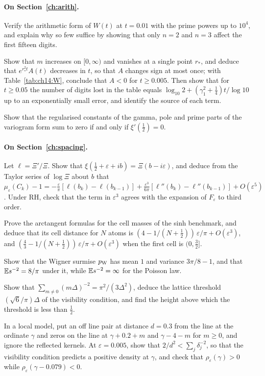 \paragraph{On Section~\ref{ch:arith}.}
\begin{exercises}
\item Verify the arithmetic form of $W(t)$ at $t=0.01$ with the prime powers up to $10^4$, and explain why so few suffice by showing that only $n=2$ and $n=3$ affect the first fifteen digits.
\item\label{ex:ch14:law} Show that $m$ increases on $[0,\infty)$ and vanishes at a single point $r_*$, and deduce that $e^{r_*^2t}A(t)$ decreases in $t$, so that $A$ changes sign at most once; with Table~\ref{tab:ch14:W}, conclude that $A<0$ for $t\ge0.005$. Then show that for $t\ge0.05$ the number of digits lost in the table equals $\log_{10}2+(\gamma_1^2+\frac14)t/\log10$ up to an exponentially small error, and identify the source of each term.
\item Show that the regularised constants of the gamma, pole and prime parts of the variogram form sum to zero if and only if $\xi'(\frac12)=0$.
\end{exercises}

\paragraph{On Section~\ref{ch:spacing}.}
\begin{exercises}
\item\label{ex:ch15:odd} Let $\ell=\Xi'/\Xi$. Show that $\xi(\frac12+\varepsilon+ib)=\Xi(b-i\varepsilon)$, and deduce from the Taylor series of $\log\Xi$ about $b$ that $\mu_\varepsilon(C_k)-1=-\frac\varepsilon\pi[\ell(b_k)-\ell(b_{k-1})]+\frac{\varepsilon^3}{6\pi}[\ell''(b_k)-\ell''(b_{k-1})]+O(\varepsilon^5)$. Under RH, check that the term in $\varepsilon^3$ agrees with the expansion of $F_\varepsilon$ to third order.
\item Prove the arctangent formulas for the cell masses of the sinh benchmark, and deduce that its cell distance for $N$ atoms is $(4-1/(N+\frac12))\,\varepsilon/\pi+O(\varepsilon^3)$, and $(\frac43-1/(N+\frac12))\,\varepsilon/\pi+O(\varepsilon^3)$ when the first cell is $(0,\frac32]$.
\item Show that the Wigner surmise $p_{\rm W}$ has mean $1$ and variance $3\pi/8-1$, and that $\mathbb{E} s^{-2}=8/\pi$ under it, while $\mathbb{E} s^{-2}=\infty$ for the Poisson law.
\item Show that $\sum_{m\ne0}(m\Delta)^{-2}=\pi^2/(3\Delta^2)$, deduce the lattice threshold $(\sqrt6/\pi)\Delta$ of the visibility condition, and find the height above which the threshold is less than $\frac12$.
\item\label{ex:ch15:beside} In a local model, put an off line pair at distance $d=0.3$ from the line at the ordinate $\gamma$ and zeros on the line at $\gamma+0.2+m$ and $\gamma-4-m$ for $m\ge0$, and ignore the reflected kernels. At $\varepsilon=0.005$, show that $2/d^2<\sum_j\delta_j^{-2}$, so that the visibility condition predicts a positive density at $\gamma$, and check that $\rho_\varepsilon(\gamma)>0$ while $\rho_\varepsilon(\gamma-0.079)<0$.
\end{exercises}
